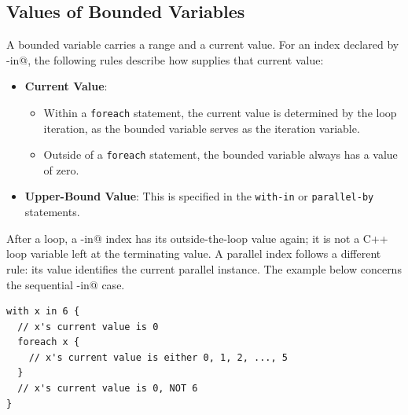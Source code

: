 \subsection*{Values of Bounded Variables}

A bounded variable carries a range and a current value. For an index declared by \co@with-in@, the following rules describe how \co@foreach@ supplies that current value:

\begin{itemize}[leftmargin=1.6em]
\item \textbf{Current Value}:
\begin{itemize}[leftmargin=1.6em]
\item Within a \texttt{foreach} statement, the current value is determined by the loop iteration, as the bounded variable serves as the iteration variable.
\item Outside of a \texttt{foreach} statement, the bounded variable always has a value of zero.
\end{itemize}
\end{itemize}

\begin{itemize}[leftmargin=1.6em]
\item \textbf{Upper-Bound Value}: This is specified in the \texttt{with-in} or \texttt{parallel-by} statements.
\end{itemize}

After a \co@foreach@ loop, a \co@with-in@ index has its outside-the-loop value again; it is not a C++ loop variable left at the terminating value. A parallel index follows a different rule: its value identifies the current parallel instance. The example below concerns the sequential \co@with-in@ case.

\begin{lstlisting}[language=croqtile,caption={Values of Bounded Variables}]
with x in 6 {
  // x's current value is 0
  foreach x {
    // x's current value is either 0, 1, 2, ..., 5
  }
  // x's current value is 0, NOT 6
}
\end{lstlisting}

